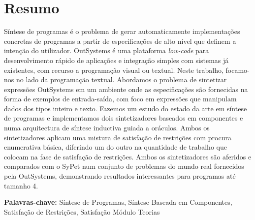 \section*{Resumo}


Síntese de programas é o problema de gerar automaticamente implementações
concretas de programas a partir de especificações de alto nível que definem a
intenção do utilizador.
OutSystems é uma plataforma \textit{low-code} para desenvolvimento rápido de
aplicações e integração simples com sistemas já existentes, com recurso a
programação visual ou textual.
Neste trabalho, focamo-nos no lado da programação textual.
Abordamos o problema de sintetizar expressões OutSystems em um ambiente
onde as especificações são fornecidas na forma de exemplos de entrada-saída,
com foco em expressões que manipulam dados dos tipos inteiro e texto.
Fazemos um estudo do estado da arte em síntese de programas e implementamos dois
sintetizadores baseados em componentes e numa arquitectura de síntese inductiva
guiada a oráculos.
Ambos os sintetizadores aplicam uma mistura de satisfação de restrições com
procura enumerativa básica, diferindo um do outro na quantidade de trabalho que
colocam na fase de satisfação de restrições.
Ambos os sintetizadores são aferidos e comparados com o SyPet num conjunto de
problemas do mundo real fornecidos pela OutSystems, demonstrando resultados
interessantes para programas até tamanho 4.

\vfill

\textbf{\Large Palavras-chave:} Síntese de Programas, Síntese Baseada em
Componentes, Satisfação de Restrições, Satisfação Módulo Teorias

\cleardoublepage
